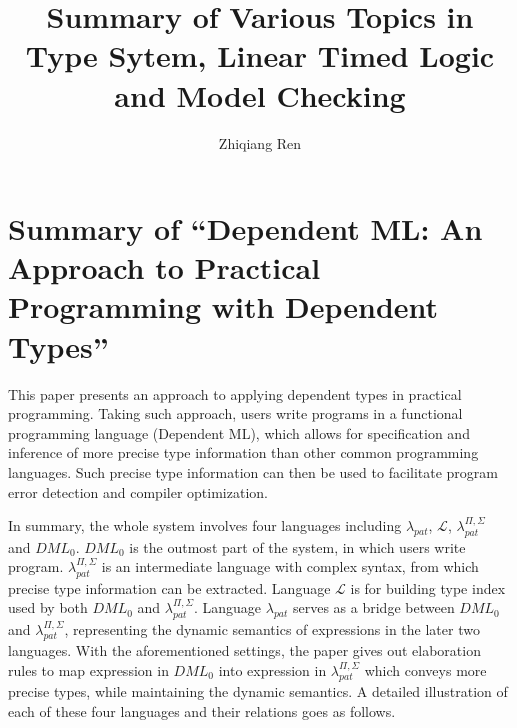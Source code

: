 \documentclass{llncs}
\date{}
\newcommand{\dmllampat}{$\lambda_{pat}$}
\newcommand{\dmlL}{$\mathcal{L}$}
\newcommand{\dmllamall}{$\lambda_{pat}^{\Pi,\Sigma}$}
\newcommand{\dmlzero}{$DML_0$}
\begin{document}
\title{%
Summary of Various Topics in \break
Type Sytem, Linear Timed Logic and Model Checking
} %
\author{Zhiqiang Ren}

\maketitle %

% 
% 


\setcounter{page}{1}

\tableofcontents 

\baselineskip=11.875pt

\newpage 
\section{Summary of ``Dependent ML: An Approach to Practical
Programming with Dependent Types''\cite{Xi2007Dependent}}
  \label{section:DML}

This paper presents an approach to applying dependent types in practical
programming. Taking such approach, users write programs in a functional
programming language (Dependent ML), which allows for specification and
inference of more precise type information than other common programming
languages. Such precise type information can then be used to facilitate
program error detection and compiler optimization.

In summary, the whole system involves four languages including \dmllampat, \dmlL,
\dmllamall{} and \dmlzero. \dmlzero{} is the outmost part of the system, in which users
write program. \dmllamall{} is an intermediate language with complex syntax,
from which precise type information can be extracted. Language \dmlL{} is for
building type index used by both \dmlzero{} and \dmllamall. Language
\dmllampat{} serves as a bridge between \dmlzero{} and \dmllamall, representing the dynamic
semantics of expressions in the later two languages. With the aforementioned
settings, the paper gives out elaboration rules to map expression in
\dmlzero{} into expression in \dmllamall{} which conveys more precise types, while
maintaining the dynamic semantics. A detailed illustration of each of these
four languages and their relations goes as follows.
\end{document}
